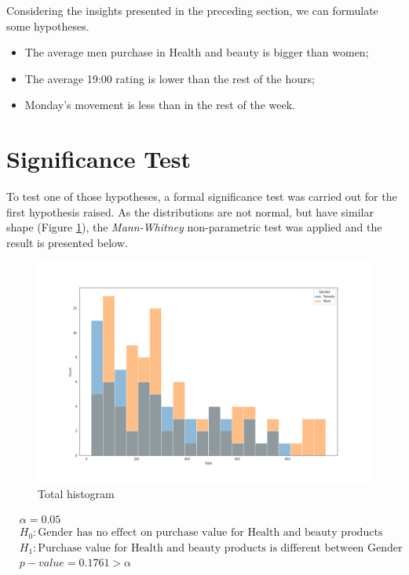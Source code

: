 \documentclass[11pt, a4]{article}
\begin{document}
Considering the insights presented in the preceding section, we can formulate some hypotheses.

\begin{itemize}
\item The average men purchase in Health and beauty is bigger than women;\\
\item The average 19:00 rating is lower than the rest of the hours;\\
\item Monday's movement is less than in the rest of the week.

\end{itemize}

\section*{Significance Test}

To test one of those hypotheses, a formal significance test was carried out for the first hypothesis raised. As the distributions are not normal, but have similar shape (Figure \ref{fig:test}), the \textit{Mann-Whitney} non-parametric test was applied and the result is presented below. 

\begin{figure}
\includegraphics[scale=0.35]{test}
\centering
\caption{Total histogram}
\label{fig:test}
\end{figure}

\begin{align*}
&\alpha = 0.05\\
&H_0: \text{Gender has no effect on purchase value for Health and beauty products}  \\
&H_1:\text{Purchase value for Health and beauty products is different between Gender}\\
& p-value=0.1761 > \alpha\\
\end{align*}
\end{document}
